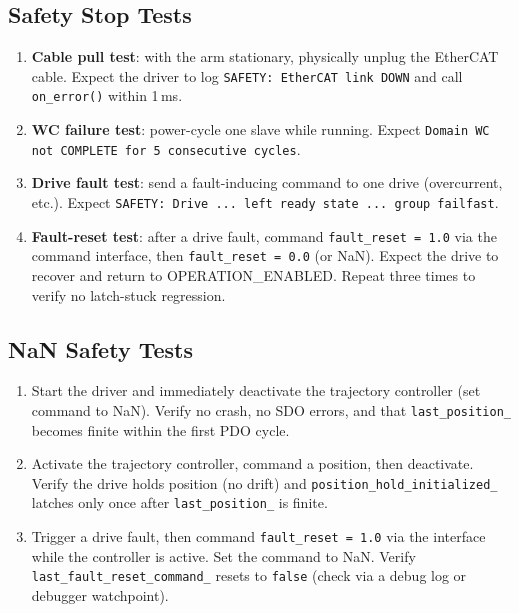 \documentclass[11pt,a4paper]{article}
\begin{document}
\subsection{Safety Stop Tests}

\begin{enumerate}
  \item \textbf{Cable pull test}: with the arm stationary, physically unplug
        the EtherCAT cable.  Expect the driver to log
        \texttt{SAFETY: EtherCAT link DOWN} and call \texttt{on\_error()}
        within 1\,ms.
  \item \textbf{WC failure test}: power-cycle one slave while running.
        Expect \texttt{Domain WC not COMPLETE for 5 consecutive cycles}.
  \item \textbf{Drive fault test}: send a fault-inducing command to one drive
        (overcurrent, etc.).  Expect
        \texttt{SAFETY: Drive ... left ready state ... group failfast}.
  \item \textbf{Fault-reset test}: after a drive fault, command
        \texttt{fault\_reset = 1.0} via the command interface, then
        \texttt{fault\_reset = 0.0} (or NaN).  Expect the drive to recover
        and return to OPERATION\_ENABLED.  Repeat three times to verify no
        latch-stuck regression.
\end{enumerate}

\subsection{NaN Safety Tests}

\begin{enumerate}
  \item Start the driver and immediately deactivate the trajectory controller
        (set command to NaN).  Verify no crash, no SDO errors, and that
        \texttt{last\_position\_} becomes finite within the first PDO cycle.
  \item Activate the trajectory controller, command a position, then
        deactivate.  Verify the drive holds position (no drift) and
        \texttt{position\_hold\_initialized\_} latches only once after
        \texttt{last\_position\_} is finite.
  \item Trigger a drive fault, then command \texttt{fault\_reset = 1.0} via
        the interface while the controller is active.  Set the command to NaN.
        Verify \texttt{last\_fault\_reset\_command\_} resets to \texttt{false}
        (check via a debug log or debugger watchpoint).
\end{enumerate}
\end{document}
